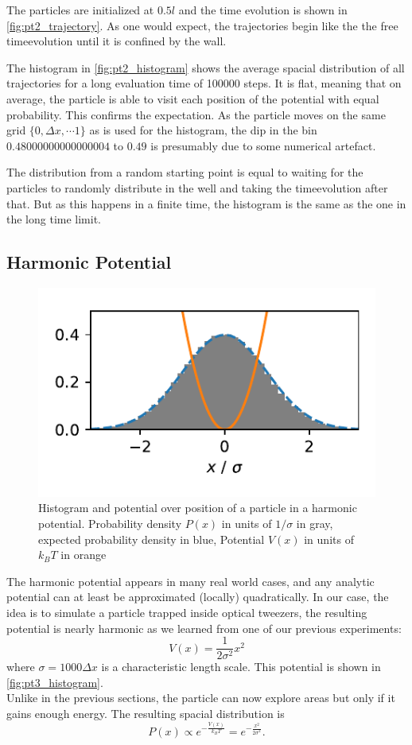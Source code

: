 \documentclass[
    parskip=half, 
    twoside=false,
    twocolumn=true,
    fontsize=11pt,
]{scrarticle}
\begin{document}
The particles are initialized at $0.5 l$ and the time evolution is shown in \autoref{fig:pt2_trajectory}.
As one would expect, the trajectories begin like the the free timeevolution until it is confined by the wall.

The histogram in \autoref{fig:pt2_histogram} shows the average spacial distribution of all trajectories for a long evaluation time of \SI{100000}{} steps. 
It is flat, meaning that on average, the particle is able to visit each position of the potential with equal probability.
This confirms the expectation.
As the particle moves on the same grid $\{0, \Delta x, \cdots 1\}$ as is used for the histogram, the dip in the bin $0.48000000000000004$ to $0.49$ is presumably due to some numerical artefact.

The distribution from a random starting point is equal to waiting for the particles to randomly distribute in the well and taking the timeevolution after that.
But as this happens in a finite time, the histogram is the same as the one in the long time limit.

\subsection{Harmonic Potential}
\begin{figure}
    \centering
    \includegraphics{figures/03 histogram.pdf}
    \caption{
        Histogram and potential over position of a particle in a harmonic potential.
        Probability density $P(x)$ in units of $1/\sigma$ in gray, expected probability density in blue, Potential $V(x)$ in units of $k_B T$ in orange
    }
    \label{fig:pt3_histogram}
\end{figure}

The harmonic potential appears in many real world cases, and any analytic potential can at least be approximated (locally) quadratically. In our case, the idea is to simulate a particle trapped inside optical tweezers, the resulting potential is nearly harmonic as we learned from one of our previous experiments:
$$ V(x) = \frac{1}{2 \sigma^2} x^2$$
where $\sigma = 1000 \Delta x$ is a characteristic length scale.
This potential is shown in \autoref{fig:pt3_histogram}.
\\
Unlike in the previous sections, the particle can now explore areas but only if it gains enough energy. The resulting spacial distribution is
$$
\label{eq:canonical_dist}
 P(x) \propto e^{-\frac{V(x)}{k_B T}} = e^{-\frac{x^2}{2 \sigma^2}}.
$$
\end{document}
